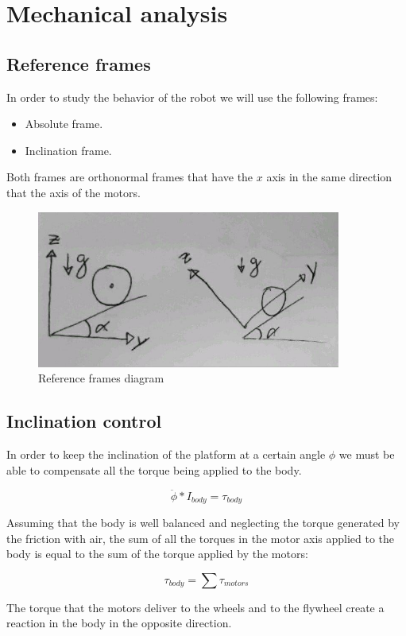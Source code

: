 \section{Mechanical analysis}
\subsection{Reference frames}
In order to study the behavior of the robot we will use the following frames:
\begin{itemize}
    \item Absolute frame. 
    \item Inclination frame.
\end{itemize}
Both frames are orthonormal frames that have the $x$ axis in the same direction that the axis of the motors.

\begin{figure}[ht]
	\centering
	\includegraphics[width=10cm]{img/reference_frames.jpg}
	\caption{Reference frames diagram}
	\label{fig:Reference frames diagram}
\end{figure}


\subsection{Inclination control}
In order to keep the inclination of the platform at a certain angle $\phi$ we must be able to compensate all the torque being applied to the body.

\[\ddot{\phi} * I_{body} = \tau_{body} \]

Assuming that the body is well balanced and neglecting the torque generated by the friction with air, the sum of all the torques in the motor axis applied to the body is equal to the sum of the torque applied by the motors:

\[\tau_{body} = \sum \tau_{motors}\]

The torque that the motors deliver to the wheels and to the flywheel create a reaction in the body in the opposite direction.



